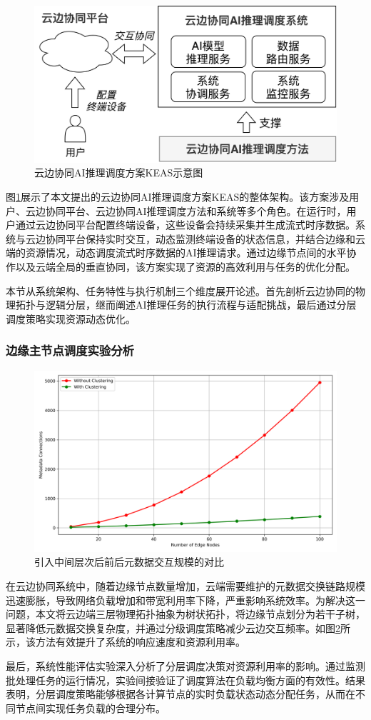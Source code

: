 \begin{figure}[h]
  \centering
  \includegraphics[width=0.7\linewidth]{pics/3-all.png}
  \caption{云边协同AI推理调度方案KEAS示意图}
  \label{fig:3-all}
\end{figure}

图\ref{fig:3-all}展示了本文提出的云边协同AI推理调度方案KEAS的整体架构。该方案涉及用户、云边协同平台、云边协同AI推理调度方法和系统等多个角色。在运行时，用户通过云边协同平台配置终端设备，这些设备会持续采集并生成流式时序数据。系统与云边协同平台保持实时交互，动态监测终端设备的状态信息，并结合边缘和云端的资源情况，动态调度流式时序数据的AI推理请求。通过边缘节点间的水平协作以及云端全局的垂直协同，该方案实现了资源的高效利用与任务的优化分配。

本节从系统架构、任务特性与执行机制三个维度展开论述。首先剖析云边协同的物理拓扑与逻辑分层，继而阐述AI推理任务的执行流程与适配挑战，最后通过分层调度策略实现资源动态优化。




\subsubsection{边缘主节点调度实验分析}

\begin{figure}[ht]
  \centering
  \includegraphics[width=0.8\linewidth]{pics/expr/metadata_connections_comparison.png}
  \caption{引入中间层次后前后元数据交互规模的对比}
  \label{fig:exp5}
\end{figure}

在云边协同系统中，随着边缘节点数量增加，云端需要维护的元数据交换链路规模迅速膨胀，导致网络负载增加和带宽利用率下降，严重影响系统效率。为解决这一问题，本文将云边端三层物理拓扑抽象为树状拓扑，将边缘节点划分为若干子树，显著降低元数据交换复杂度，并通过分级调度策略减少云边交互频率。如图\ref{fig:exp5}所示，该方法有效提升了系统的响应速度和资源利用率。

最后，系统性能评估实验深入分析了分层调度决策对资源利用率的影响。通过监测批处理任务的运行情况，实验间接验证了调度算法在负载均衡方面的有效性。结果表明，分层调度策略能够根据各计算节点的实时负载状态动态分配任务，从而在不同节点间实现任务负载的合理分布。